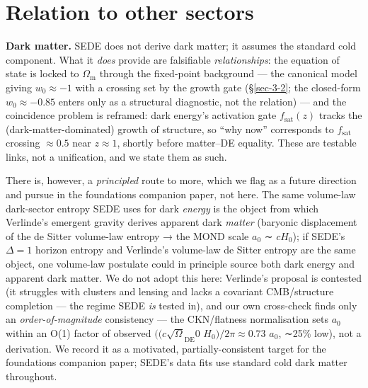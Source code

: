 \documentclass[preprint,12pt]{elsarticle}
\begin{document}
\section{Relation to other sectors}\label{sec-7}

\textbf{Dark matter.} SEDE does not derive dark matter; it assumes the
standard cold component. What it \emph{does} provide are falsifiable
\emph{relationships}: the equation of state is locked to
\(\Omega _{\mathrm{m}}\) through the fixed-point background --- the
canonical model giving \(w_{0} \approx  -1\) with a crossing set by the
growth gate (§\ref{sec-3-2}; the closed-form \(w_{0} \approx  -0.85\)
enters only as a structural diagnostic, not the relation) --- and the
coincidence problem is reframed: dark energy's activation gate
\(f_{\mathrm{sat}}(z)\) tracks the (dark-matter-dominated) growth of
structure, so ``why now'' corresponds to \(f_{\mathrm{sat}}\) crossing
\(\approx  0.5\) near \(z \approx  1\), shortly before matter--DE
equality. These are testable links, not a unification, and we state them
as such.

There is, however, a \emph{principled} route to more, which we flag as a
future direction and pursue in the foundations companion paper, not
here. The same volume-law dark-sector entropy SEDE uses for dark
\emph{energy} is the object from which Verlinde's emergent gravity
\citep{Verlinde:2016toy} derives apparent dark \emph{matter} (baryonic
displacement of the de Sitter volume-law entropy → the MOND scale
\(a_{0}\) ∼ \(cH_{0}\)); if SEDE's \(\Delta  = 1\) horizon entropy and
Verlinde's volume-law de Sitter entropy are the same object, one
volume-law postulate could in principle source both dark energy and
apparent dark matter. We do not adopt this here: Verlinde's proposal is
contested (it struggles with clusters and lensing and lacks a covariant
CMB/structure completion --- the regime SEDE \emph{is} tested in), and
our own cross-check finds only an \emph{order-of-magnitude} consistency
--- the CKN/flatness normalisation sets \(a_{0}\) within an O(1) factor
of observed \(((c\surd \Omega _\mathrm{DE}0\)
\(H_{0})/2\pi  \approx  0.73\) \(a_{0}\), ∼25\% low), not a derivation.
We record it as a motivated, partially-consistent target for the
foundations companion paper; SEDE's data fits use standard cold dark
matter throughout.
\end{document}

